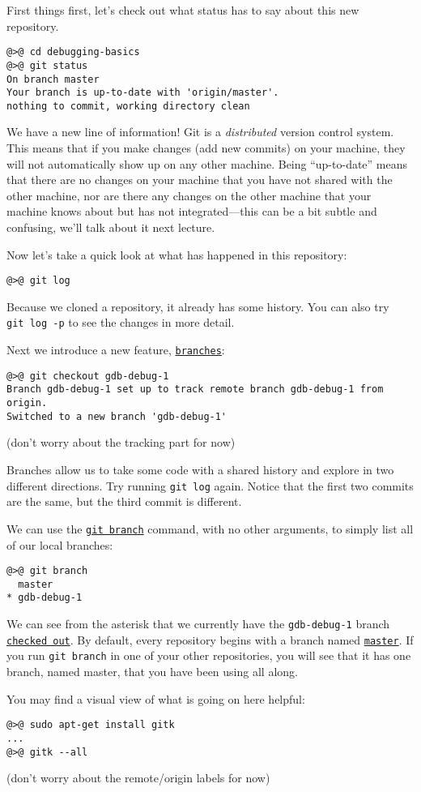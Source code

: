 \documentclass{article}
\begin{document}
First things first, let's check out what status has to say about this new
repository.
\begin{lstlisting}
@>@ cd debugging-basics
@>@ git status
On branch master
Your branch is up-to-date with 'origin/master'.
nothing to commit, working directory clean
\end{lstlisting}
We have a new line of information!
Git is a \emph{distributed} version control system. This means that if you
make changes (add new commits) on your machine, they will not automatically
show up on any other machine.
Being ``up-to-date'' means that there are no changes on your machine that you
have not shared with the other machine, nor are there any changes on the other
machine that your machine knows about but has not integrated---this can be a
bit subtle and confusing, we'll talk about it next lecture.

Now let's take a quick look at what has happened in this repository:
\begin{lstlisting}
@>@ git log
\end{lstlisting}
Because we cloned a repository, it already has some history. You can also try
\texttt{git~log~-p} to see the changes in more detail.

Next we introduce a new feature, \texttt{\ul{branches}}:
\begin{lstlisting}
@>@ git checkout gdb-debug-1
Branch gdb-debug-1 set up to track remote branch gdb-debug-1 from origin.
Switched to a new branch 'gdb-debug-1'
\end{lstlisting}
{\small (don't worry about the tracking part for now)}

Branches allow us to take some code with a shared history and explore in two
different directions. Try running \texttt{git~log} again. Notice that the
first two commits are the same, but the third commit is different.

We can use the \texttt{\ul{git branch}} command, with no other arguments, to
simply list all of our local branches:
\begin{lstlisting}
@>@ git branch
  master
* gdb-debug-1
\end{lstlisting}
We can see from the asterisk that we currently have the \texttt{gdb-debug-1}
branch \texttt{\ul{checked~out}}.
By default, every repository begins with a branch named \texttt{\ul{master}}.
If you run \texttt{git~branch} in one of your other repositories, you will see
that it has one branch, named master, that you have been using all along.

You may find a visual view of what is going on here helpful:
\begin{lstlisting}
@>@ sudo apt-get install gitk
...
@>@ gitk --all
\end{lstlisting}
{\small (don't worry about the remote/origin labels for now)}
\end{document}
